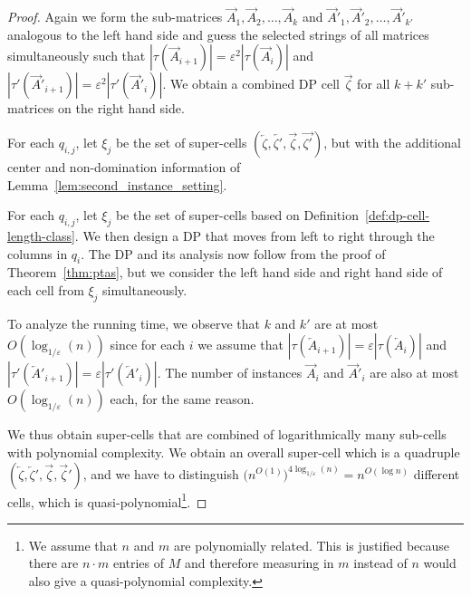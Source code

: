 \begin{proof}
    Again we form the sub-matrices $\overrightarrow{A}_1,\overrightarrow{A}_2,\dotsc,\overrightarrow{A}_{k}$ and  $\overrightarrow{A}'_1,\overrightarrow{A}'_2,\dotsc,\overrightarrow{A}'_{k'}$ analogous to the left hand side and guess the selected strings of all matrices simultaneously 
    such that $|\tau(\overrightarrow{A}_{i+1})| =  \varepsilon^2 |\tau(\overrightarrow{A}_{i})|$ and  $|\tau'(\overrightarrow{A}'_{i+1})| =  \varepsilon^2 |\tau'(\overrightarrow{A}'_{i})|$. 
    We obtain a combined DP cell $\overrightarrow{\zeta}$ for all $k+k'$ sub-matrices on the right hand side.
    \begin{definition}
        For each $q_{i,j}$, let $\xi_j$ be the set of super-cells $(\overleftarrow{\zeta}, \overleftarrow{\zeta'}, \overrightarrow{\zeta}, \overrightarrow{\zeta'})$, but with the additional center and non-domination information of Lemma~\ref{lem:second_instance_setting}.
        \label{def:dp-cell-length-class}
    \end{definition}

    For each $q_{i,j}$, let $\xi_j$ be the set of super-cells based on Definition~\ref{def:dp-cell-length-class}.
    We then design a DP that moves from left to right through the columns in $q_i$.
    The DP and its analysis now follow from the proof of Theorem~\ref{thm:ptas}, but we consider the left hand side and right hand side of each cell from $\xi_j$ simultaneously.

    To analyze the running time, we observe that $k$ and $k'$ are at most $O(\log_{1/\varepsilon}(n))$ since for each $i$ we assume that $|\tau(\overleftarrow{A}_{i+1})| =  \varepsilon |\tau(\overleftarrow{A}_{i})|$
    and $|\tau'(\overleftarrow{A}'_{i+1})| =  \varepsilon |\tau'(\overleftarrow{A}'_{i})|$. 
    The number of instances $\overrightarrow{A}_i$ and $\overrightarrow{A}'_i$ are also at most $O(\log_{1/\varepsilon}(n))$ each, for the same reason.

    We thus obtain super-cells that are combined of logarithmically many sub-cells with polynomial complexity.
    We obtain an overall super-cell which is a quadruple $(\overleftarrow{\zeta},\overleftarrow{\zeta}',\overrightarrow{\zeta},\overrightarrow{\zeta}')$, and we have to distinguish $\bigl(n^{O(1)}\bigr)^{4 \log_{1/\varepsilon}(n)} = n^{O(\log n)}$
    different cells, which is quasi-polynomial\footnote{We assume that $n$ and $m$ are polynomially related. This is justified because there are $n \cdot m$ entries of $M$ and therefore measuring in $m$ instead of $n$ would also give a quasi-polynomial complexity.}.


\end{proof}
